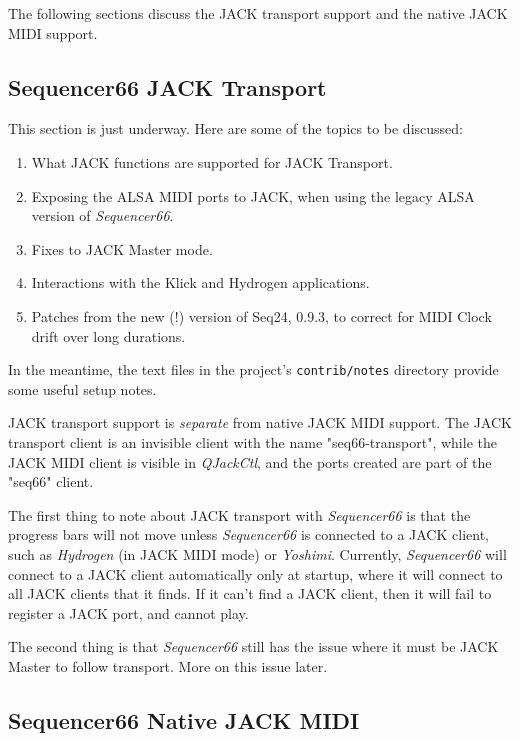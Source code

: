   The following sections discuss the JACK transport support and the native
   JACK MIDI support.

\subsection{Sequencer66 JACK Transport}
\label{subsec:seq66_jack_transport}

   This section is just underway.  Here are some of the topics to be discussed:

   \begin{enumerate}
      \item What JACK functions are supported for JACK Transport.
      \item Exposing the ALSA MIDI ports to JACK, when using the legacy
         ALSA version of \textsl{Sequencer66}.
      \item Fixes to JACK Master mode.
      \item Interactions with the Klick and Hydrogen applications.
      \item Patches from the new (!) version of Seq24, 0.9.3, to correct
         for MIDI Clock drift over long durations.
   \end{enumerate}

   In the meantime, the text files in the project's \texttt{contrib/notes}
   directory provide some useful setup notes.

   JACK transport support is \textsl{separate} from native JACK MIDI support.
   The JACK transport client is an invisible client with the
   name "seq66-transport", while the JACK MIDI client is visible in
   \textsl{QJackCtl}, and the ports created are part of the
   "seq66" client.

   The first thing to note about JACK transport with \textsl{Sequencer66} is
   that the progress bars will not move unless \textsl{Sequencer66} is
   connected to a JACK client, such as \textsl{Hydrogen} (in JACK MIDI mode)
   or \textsl{Yoshimi}.  Currently, \textsl{Sequencer66} will connect to a JACK
   client automatically only at startup, where it will connect to all JACK
   clients that it finds.  If it can't find a JACK client, then it will
   fail to register a JACK port, and cannot play.

   The second thing is that \textsl{Sequencer66} still has the issue where it
   must be JACK Master to follow transport.  More on this issue later.

\subsection{Sequencer66 Native JACK MIDI}
\label{subsec:seq66_jack_native_midi}

